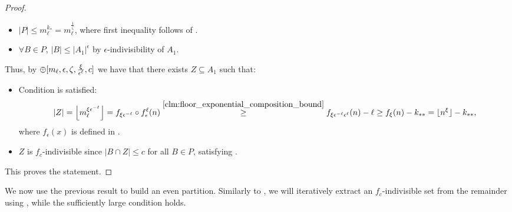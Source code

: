 \begin{lemma}
\begin{proof}
\begin{itemize}
                    \item $|P| \leq m_\ell^{k_*} = m_\ell^{\frac{1}{\zeta}}$, where first inequality follows 
                        of .
                    \item $\forall B \in P$, $|B| \leq |A_1|^\epsilon$ by $\epsilon$-indivisibility of $A_1$.
                \end{itemize}
                Thus, by $\oplus[ m_\ell, \epsilon, \zeta, \frac{\xi}{\epsilon^\ell}, c ]$ we have that there exists $Z \subseteq A_1$ such that:
                \begin{itemize}
                    \item Condition  is satisfied:
                        \[
                            |Z| = \left\lfloor m_\ell^{\xi\epsilon^{-\ell}} \right\rfloor
                            = f_{\xi\epsilon^{-\ell}} \circ f_{\epsilon}^{\ell} (n)
                            \stackrel{\ref{clm:floor_exponential_composition_bound}}{\geq} f_{\xi\epsilon^{-\ell} \epsilon^{\ell}} (n) - \ell
                            \geq f_\xi (n) - k_{**}
                            = \lfloor n^\xi \rfloor - k_{**},
                        \]
                        where $f_\epsilon(x)$ is defined in .
                    \item $Z$ is $f_c$-indivisible since $|B \cap Z| \leq c$ for all $B \in P$,
                        satisfying .
                \end{itemize}
                This proves the statement.
            \end{proof}
        \end{lemma}

        We now use the previous result to build an even partition.
        Similarly to , we will iteratively extract an $f_c$-indivisible
        set from the remainder using , while
        the sufficiently large condition holds.

